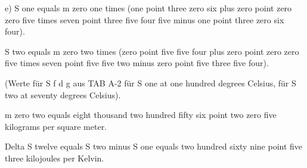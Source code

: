 e) S one equals m zero one times (one point three zero six plus zero point zero zero five times seven point three five four five minus one point three zero six four).

S two equals m zero two times (zero point five five four plus zero point zero zero five times seven point five five two minus zero point five three five four).

(Werte für S f d g aus TAB A-2 für S one at one hundred degrees Celsius, für S two at seventy degrees Celsius).

m zero two equals eight thousand two hundred fifty six point two zero five kilograms per square meter.

Delta S twelve equals S two minus S one equals two hundred sixty nine point five three kilojoules per Kelvin.
